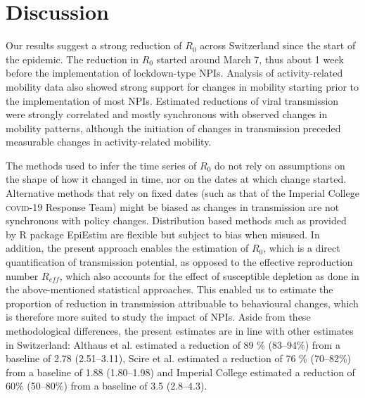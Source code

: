 \section{Discussion}
Our results suggest a strong reduction of $R_0$ across Switzerland since the start of the epidemic. The reduction in $R_0$ started around March 7, thus about 1 week before the implementation of lockdown-type NPIs. Analysis of activity-related mobility data also showed strong support for changes in mobility starting prior to the implementation of most NPIs. Estimated reductions of viral transmission were strongly correlated and mostly synchronous with observed changes in mobility patterns, although the initiation of changes in transmission preceded measurable changes in activity-related mobility. 

The methods used to infer the time series of $R_0$ do not rely on assumptions on the shape of how it changed in time, nor on the dates at which change started. Alternative methods that rely on fixed dates (such as that of the Imperial College \textsc{covid}-19 Response Team\cite[-6\baselineskip]{Flaxman:Report13Estimating:2020}) might be biased as changes in transmission are not synchronous with policy changes. Distribution based methods such as provided by R package EpiEstim\cite[-4\baselineskip]{Wallinga:DifferentEpidemicCurves:2004,Cori:NewFrameworkSoftware:2013} are flexible but subject to bias when misused\cite{Lipsitch:CommentPanLiu:2020}. In addition, the present approach enables the estimation of $R_0$, which is a direct quantification of transmission potential, as opposed to the effective reproduction number $R_{eff}$, which also accounts for the effect of susceptible depletion as done in the above-mentioned statistical approaches. This enabled us to estimate the proportion of reduction in transmission attribuable to behavioural changes, which is therefore more suited to study the impact of NPIs. Aside from these methodological differences, the present estimates are in line with other estimates in Switzerland: Althaus et al.\cite{Althaus:RealtimeModelingProjections:2020} estimated a reduction of 89 \% (83–94\%) from a baseline of 2.78 (2.51–3.11), Scire et al.\cite{Scire:ReproductiveNumberCOVID19:2020} estimated a reduction of 76 \% (70–82\%) from a baseline of 1.88 (1.80–1.98) and Imperial College estimated a reduction of 60\% (50–80\%) from a baseline of 3.5 (2.8–4.3)\cite{Flaxman:Report13Estimating:2020}. 

